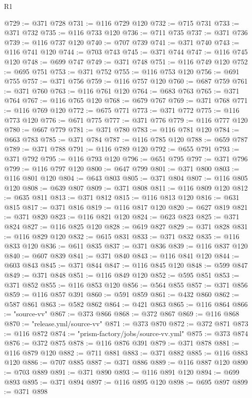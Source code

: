 \begin{lexlean}{R1}
\begin{coremodule}
@729 := @371 @728
@731 := @116 @729 @120
@732 := @715 @731
@733 := @371 @732
@735 := @116 @733 @120
@736 := @711 @735
@737 := @371 @736
@739 := @116 @737 @120
@740 := @707 @739
@741 := @371 @740
@743 := @116 @741 @120
@744 := @703 @743
@745 := @371 @744
@747 := @116 @745 @120
@748 := @699 @747
@749 := @371 @748
@751 := @116 @749 @120
@752 := @695 @751
@753 := @371 @752
@755 := @116 @753 @120
@756 := @691 @755
@757 := @371 @756
@759 := @116 @757 @120
@760 := @687 @759
@761 := @371 @760
@763 := @116 @761 @120
@764 := @683 @763
@765 := @371 @764
@767 := @116 @765 @120
@768 := @679 @767
@769 := @371 @768
@771 := @116 @769 @120
@772 := @675 @771
@773 := @371 @772
@775 := @116 @773 @120
@776 := @671 @775
@777 := @371 @776
@779 := @116 @777 @120
@780 := @667 @779
@781 := @371 @780
@783 := @116 @781 @120
@784 := @663 @783
@785 := @371 @784
@787 := @116 @785 @120
@788 := @659 @787
@789 := @371 @788
@791 := @116 @789 @120
@792 := @655 @791
@793 := @371 @792
@795 := @116 @793 @120
@796 := @651 @795
@797 := @371 @796
@799 := @116 @797 @120
@800 := @647 @799
@801 := @371 @800
@803 := @116 @801 @120
@804 := @643 @803
@805 := @371 @804
@807 := @116 @805 @120
@808 := @639 @807
@809 := @371 @808
@811 := @116 @809 @120
@812 := @635 @811
@813 := @371 @812
@815 := @116 @813 @120
@816 := @631 @815
@817 := @371 @816
@819 := @116 @817 @120
@820 := @627 @819
@821 := @371 @820
@823 := @116 @821 @120
@824 := @623 @823
@825 := @371 @824
@827 := @116 @825 @120
@828 := @619 @827
@829 := @371 @828
@831 := @116 @829 @120
@832 := @615 @831
@833 := @371 @832
@835 := @116 @833 @120
@836 := @611 @835
@837 := @371 @836
@839 := @116 @837 @120
@840 := @607 @839
@841 := @371 @840
@843 := @116 @841 @120
@844 := @603 @843
@845 := @371 @844
@847 := @116 @845 @120
@848 := @599 @847
@849 := @371 @848
@851 := @116 @849 @120
@852 := @595 @851
@853 := @371 @852
@855 := @116 @853 @120
@856 := @564 @855
@857 := @371 @856
@859 := @116 @857 @391
@860 := @591 @859
@861 := @432 @860
@862 := @587 @861
@863 := @582 @862
@864 := @421 @863
@865 := @116 @864
@866 := "source-vv"
@867 := @373 @866
@868 := @372 @867
@869 := @116 @868
@870 := "release.yml/source-vv"
@871 := @373 @870
@872 := @372 @871
@873 := @116 @872
@874 := "prism-factory/jobs/source-vv.yml"
@875 := @373 @874
@876 := @372 @875
@878 := @116 @876 @391
@879 := @371 @878
@881 := @116 @879 @120
@882 := @711 @881
@883 := @371 @882
@885 := @116 @883 @120
@886 := @707 @885
@887 := @371 @886
@889 := @116 @887 @120
@890 := @703 @889
@891 := @371 @890
@893 := @116 @891 @120
@894 := @699 @893
@895 := @371 @894
@897 := @116 @895 @120
@898 := @695 @897
@899 := @371 @898

\end{coremodule}
\end{lexlean}
